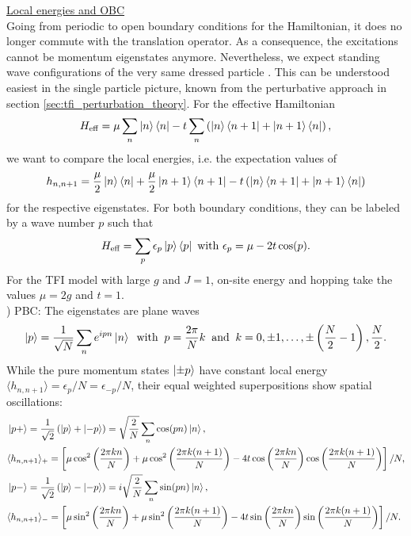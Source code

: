 \noindent \underline{Local energies and OBC} \\[0.5em]
Going from periodic to open boundary conditions for the Hamiltonian, it does no longer commute with the translation operator. As a consequence, the excitations cannot be momentum eigenstates anymore. Nevertheless, we expect standing wave configurations of the very same dressed particle \cite{van2021efficient}. 
This can be understood easiest in the single particle picture, known from the perturbative approach in section \ref{sec:tfi_perturbation_theory}. For the effective Hamiltonian 
\begin{equation}
	H_{\text{eff}} =  \mu \sum_n \ket{n} \bra{n} - t \sum_n \left( \ket{n} \bra{n+1} + \ket{n+1} \bra{n} \right),
\end{equation}
we want to compare the local energies, i.e. the expectation values of
\begin{equation}
	h_{n, n+1} =  \frac{\mu}{2} \ket{n} \bra{n} + \frac{\mu}{2} \ket{n+1} \bra{n+1} - t \left( \ket{n} \bra{n+1} + \ket{n+1} \bra{n} \right)
\end{equation}
for the respective eigenstates. For both boundary conditions, they can be labeled by a wave number $p$ such that
\begin{equation}
	H_{\text{eff}} = \sum_p \epsilon_p \ket{p} \bra{p} \text{ with } \epsilon_p =  \mu - 2t \cos(p).
\end{equation}
For the TFI model with large $g$ and $J = 1$, on-site energy and hopping take the values $\mu = 2g$ and $t = 1$. \\[0.5em]
) PBC: The eigenstates are plane waves
\begin{equation}
	\ket{p} = \frac{1}{\sqrt{N}} \sum_n e^{ipn} \ket{n} \: \text{ with }\: p = \frac{2 \pi}{N} k \:\text{ and }\: k = 0, \pm 1, \ldots, \pm \left( \frac{N}{2}-1 \right), \frac{N}{2}.
\end{equation}
While the pure momentum states $\ket{\pm p}$ have constant local energy $\langle h_{n, n+1} \rangle = \epsilon_p / N = \epsilon_{-p} / N$, their equal weighted superpositions show spatial oscillations:
\begin{align*}
	& \ket{p+} = \frac{1}{\sqrt{2}} \left( \ket{p} + \ket{-p} \right) = \sqrt{\frac{2}{N}} \sum_n \cos(pn) \ket{n}, \\
	& \langle h_{n, n+1} \rangle_+ 
	= \left[ 
	\mu \cos^2 \left( \frac{2 \pi k n}{N} \right) 
	+ \mu \cos^2 \left( \frac{2 \pi k (n+1)}{N}  \right) 
	- 4t \cos \left( \frac{2 \pi k n}{N} \right) \cos \left( \frac{2 \pi k(n+1)}{N} \right) 
	\right] / N, \\
	& \ket{p-} = \frac{1}{\sqrt{2}} \left( \ket{p} - \ket{-p} \right) = i\sqrt{\frac{2}{N}} \sum_n \sin(pn) \ket{n}, \\
	& \langle h_{n, n+1} \rangle_- 
	= \left[ 
	\mu \sin^2 \left( \frac{2 \pi k n}{N} \right) 
	+ \mu \sin^2 \left( \frac{2 \pi k (n+1)}{N} \right) 
	- 4t \sin \left( \frac{2 \pi k n}{N} \right) \sin \left( \frac{2 \pi k (n+1)}{N}  \right)
	\right] / N.
\end{align*}

